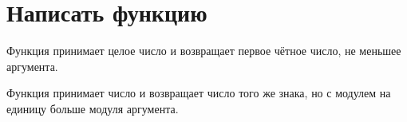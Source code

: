 
\section{Написать функцию}

\problem Функция принимает целое число и возвращает первое чётное число, не меньшее аргумента.



\problem Функция принимает число и возвращает число того же знака, но с модулем на единицу больше модуля аргумента.

